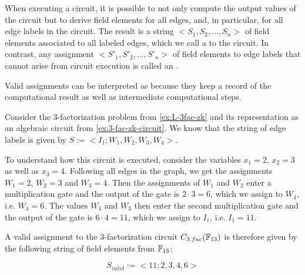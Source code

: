 When executing a circuit, it is possible to not only compute the output values of the circuit but to derive field elements for all edges, and, in particular, for all edge labels in the circuit. The result is a string $<S_1,S_2,\ldots, S_n>$ of field elements associated to all labeled edges, which we call a  to the circuit. In contrast, any assignment $<S'_1,S'_2,\ldots, S'_n>$ of field elements to edge labels that cannot arise from circuit execution is called an .

Valid assignments can be interpreted as  because they keep a record of the computational result as well as intermediate computational steps. 
\begin{example}[3-factorization]
\label{ex:3-fac-zk-circuit_2}
Consider the $3$-factorization problem from \examplename{} \ref{ex:L-3fac-zk} and its representation as an algebraic circuit from \examplename{} \ref{ex:3-fac-zk-circuit}. We know that the string of edge labels is given by $S:=<I_{1};W_{1},W_{2},W_{3}, W_{4}>$. 

To understand how this circuit is executed, consider the variables $x_1=2$, $x_2=3$ as well as $x_3=4$. Following all edges in the graph, we get the assignments $W_1=2$, $W_2=3$ and $W_3=4$. Then the assignments of $W_1$ and $W_2$ enter a multiplication gate and the output of the gate is $2\cdot 3 = 6$, which we assign to $W_4$, i.e. $W_4=6$. The values $W_4$ and $W_3$ then enter the second multiplication gate and the output of the gate is $6\cdot 4 = 11$, which we assign to $I_1$, i.e. $I_1=11$. 

A valid assignment to the 3-factorization circuit $C_{3.fac}(\mathbb{F}_{13})$ is therefore given by the following string of field elements from $\mathbb{F}_{13}$:

\begin{equation}\label{C3fac}
S_{valid}:=<11;2,3,4,6>
\end{equation}


\end{example}
